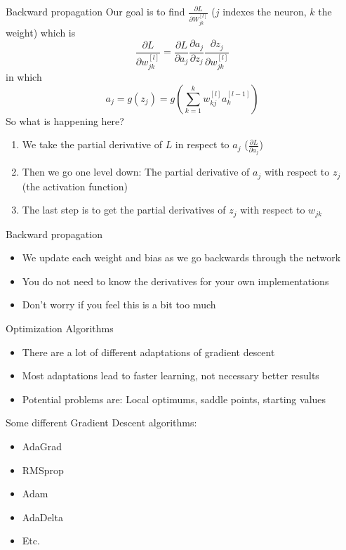 \documentclass{beamer}
\begin{document}
\begin{frame}[t]{Backward propagation}
  Our goal is to find $\frac{\partial L}{\partial W^{[l]}_{jk}}$ ($j$ indexes the neuron, $k$ the weight) which is
  \begin{equation}
    \frac{\partial L}{\partial w^{[l]}_{jk}} = \frac{\partial L}{\partial a_j}\frac{\partial a_j}{\partial z_j}\frac{\partial z_j}{\partial w^{[l]}_{jk}}
  \end{equation}
  in which 
  \begin{equation}
    a_j = g(z_j) =  g(\sum^k_{k=1} w^{[l]}_{kj}a^{[l-1]}_{k})
  \end{equation}
  So what is happening here?
  \begin{enumerate}
    \item We take the partial derivative of $L$ in respect to $a_j$ ($\frac{\partial L}{\partial a_j}$)
    \item Then we go one level down: The partial derivative of $a_j$ with respect to $z_j$ (the activation function)
    \item The last step is to get the partial derivatives of $z_j$ with respect to $w_{jk}$ 
  \end{enumerate}
\end{frame}

\begin{frame}[t]{Backward propagation}
  \begin{itemize}
    \item We update each weight and bias as we go backwards through the network
    \item You do not need to know the derivatives for your own implementations
    \item Don't worry if you feel this is a bit too much
  \end{itemize}
\end{frame}

\begin{frame}[t]{Optimization Algorithms}
  \begin{itemize}
    \item There are a lot of different adaptations of gradient descent
    \item Most adaptations lead to faster learning, not necessary better results
    \item Potential problems are: Local optimums, saddle points, starting values
  \end{itemize}
  Some different Gradient Descent algorithms:
  \begin{itemize}
    \item AdaGrad
    \item RMSprop
    \item Adam
    \item AdaDelta
    \item Etc.
  \end{itemize}
\end{frame}
\end{document}
